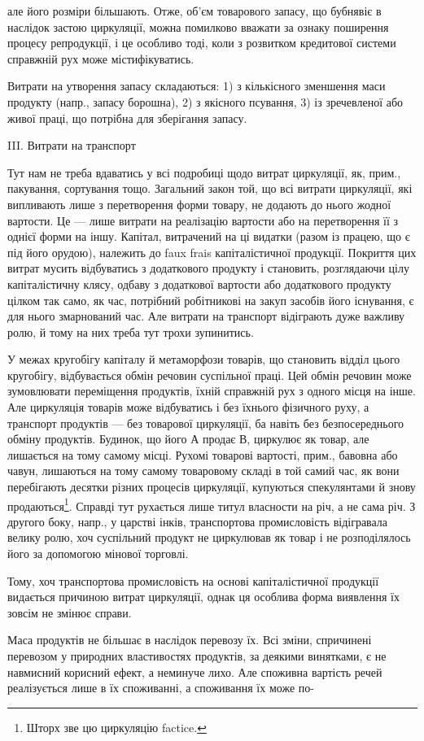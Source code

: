 але його розміри більшають. Отже, об’єм товарового запасу, що
бубнявіє в наслідок застою циркуляції, можна помилково вважати за
ознаку поширення процесу репродукції, і це особливо тоді, коли з розвитком
кредитової системи справжній рух може містифікуватись.

Витрати на утворення запасу складаються: 1) з кількісного зменшення
маси продукту (напр., запасу борошна), 2) з якісного псування, 3) із зречевленої
або живої праці, що потрібна для зберігання запасу.

III. Витрати на транспорт

Тут нам не треба вдаватись у всі подробиці щодо витрат циркуляції,
як, прим., пакування, сортування тощо. Загальний закон той, що всі
витрати циркуляції, які випливають лише з перетворення
форми товару, не додають до нього жодної
вартости. Це — лише витрати на реалізацію вартости або на перетворення
її з однієї форми на іншу. Капітал, витрачений на ці видатки
(разом із працею, що є під його орудою), належить до faux frais капіталістичної
продукції. Покриття цих витрат мусить відбуватись з додаткового
продукту і становить, розглядаючи цілу капіталістичну клясу, одбаву
з додаткової вартости або додаткового продукту цілком так само,
як час, потрібний робітникові на закуп засобів його існування, є для нього
змарнований час. Але витрати на транспорт відіграють дуже важливу
ролю, й тому на них треба тут трохи зупинитись.

У межах кругобігу капіталу й метаморфози товарів, що становить
відділ цього кругобігу, відбувається обмін речовин суспільної праці. Цей
обмін речовин може зумовлювати переміщення продуктів, їхній справжній
рух з одного місця на інше. Але циркуляція товарів може відбуватись і
без їхнього фізичного руху, а транспорт продуктів — без товарової циркуляції,
ба навіть без безпосереднього обміну продуктів. Будинок, що
його А продає В, циркулює як товар, але лишається на тому самому
місці. Рухомі товарові вартості, прим., бавовна або чавун, лишаються
на тому самому товаровому складі в той самий час, як вони перебігають
десятки різних процесів циркуляції, купуються спекулянтами й знову
продаються\footnote{
Шторх зве цю циркуляцію factice.
}. Справді тут рухається лише титул власности на річ, а не
сама річ. З другого боку, напр., у царстві інків, транспортова промисловість
відігравала велику ролю, хоч суспільний продукт не циркулював як
товар і не розподілялось його за допомогою мінової торговлі.

Тому, хоч транспортова промисловість на основі капіталістичної продукції
видається причиною витрат циркуляції, однак ця особлива форма
виявлення їх зовсім не змінює справи.

Маса продуктів не більшає в наслідок перевозу їх. Всі зміни, спричинені
перевозом у природних властивостях продуктів, за деякими винятками,
є не навмисний корисний ефект, а неминуче лихо. Але споживна вартість
речей реалізується лише в їх споживанні, а споживання їх може по-